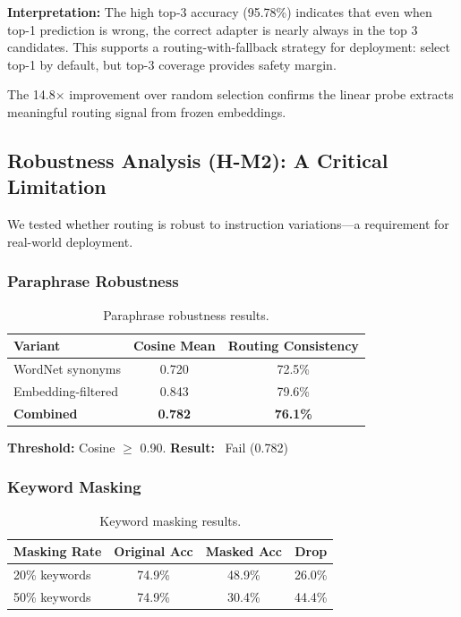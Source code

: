 \textbf{Interpretation:} The high top-3 accuracy (95.78\%) indicates that even when top-1 prediction is wrong, the correct adapter is nearly always in the top 3 candidates. This supports a routing-with-fallback strategy for deployment: select top-1 by default, but top-3 coverage provides safety margin.

The 14.8$\times$ improvement over random selection confirms the linear probe extracts meaningful routing signal from frozen embeddings.

\subsection{Robustness Analysis (H-M2): A Critical Limitation}

We tested whether routing is robust to instruction variations---a requirement for real-world deployment.

\subsubsection{Paraphrase Robustness}

\begin{table}[h]
\centering
\begin{tabular}{lcc}
\toprule
\textbf{Variant} & \textbf{Cosine Mean} & \textbf{Routing Consistency} \\
\midrule
WordNet synonyms & 0.720 & 72.5\% \\
Embedding-filtered & 0.843 & 79.6\% \\
\textbf{Combined} & \textbf{0.782} & \textbf{76.1\%} \\
\bottomrule
\end{tabular}
\caption{Paraphrase robustness results.}
\label{tab:paraphrase}
\end{table}

\textbf{Threshold:} Cosine $\geq$ 0.90. \textbf{Result:} \xmark~Fail (0.782)

\subsubsection{Keyword Masking}

\begin{table}[h]
\centering
\begin{tabular}{lccc}
\toprule
\textbf{Masking Rate} & \textbf{Original Acc} & \textbf{Masked Acc} & \textbf{Drop} \\
\midrule
20\% keywords & 74.9\% & 48.9\% & 26.0\% \\
50\% keywords & 74.9\% & 30.4\% & 44.4\% \\
\bottomrule
\end{tabular}
\caption{Keyword masking results.}
\label{tab:masking}
\end{table}


